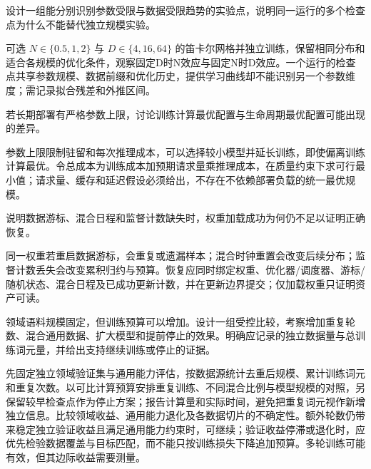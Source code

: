 \begin{exercises}
\begin{exercise} 设计一组能分别识别参数受限与数据受限趋势的实验点，说明同一运行的多个检查点为什么不能替代独立规模实验。

\begin{solution}
可选 $N\in\{0.5,1,2\}$ 与 $D\in\{4,16,64\}$ 的笛卡尔网格并独立训练，保留相同分布和适合各规模的优化条件，观察固定D时N效应与固定N时D效应。一个运行的检查点共享参数规模、数据前缀和优化历史，提供学习曲线却不能识别另一个参数维度；需记录拟合残差和外推区间。
\end{solution}
\end{exercise}

\begin{exercise}\optional 若长期部署有严格参数上限，讨论训练计算最优配置与生命周期最优配置可能出现的差异。

\begin{solution}
参数上限限制驻留和每次推理成本，可以选择较小模型并延长训练，即使偏离训练计算最优。令总成本为训练成本加预期请求量乘推理成本，在质量约束下求可行最小值；请求量、缓存和延迟假设必须给出，不存在不依赖部署负载的统一最优规模。
\end{solution}
\end{exercise}

\begin{exercise} 说明数据游标、混合日程和监督计数缺失时，权重加载成功为何仍不足以证明正确恢复。

\begin{solution}
同一权重若重启数据游标，会重复或遗漏样本；混合时钟重置会改变后续分布；监督计数丢失会改变累积归约与预算。恢复应同时绑定权重、优化器/调度器、游标/随机状态、混合日程及已成功更新计数，并在更新边界提交；仅加载权重只证明资产可读。
\end{solution}
\end{exercise}

\begin{exercise} 领域语料规模固定，但训练预算可以增加。设计一组受控比较，考察增加重复轮数、混合通用数据、扩大模型和提前停止的效果。明确应记录的独立数据量与总训练词元量，并给出支持继续训练或停止的证据。

\begin{solution}
先固定独立领域验证集与通用能力评估，按数据源统计去重后规模、累计训练词元和重复次数。以可比计算预算安排重复训练、不同混合比例与模型规模的对照，另保留较早检查点作为停止方案；报告计算量和实际时间，避免把重复词元视作新增独立信息。比较领域收益、通用能力退化及各数据切片的不确定性。额外轮数仍带来稳定独立验证收益且满足通用能力约束时，可继续；验证收益停滞或退化时，应优先检验数据覆盖与目标匹配，而不能只按训练损失下降追加预算。多轮训练可能有效，但其边际收益需要测量。
\end{solution}
\end{exercise}

\end{exercises}

